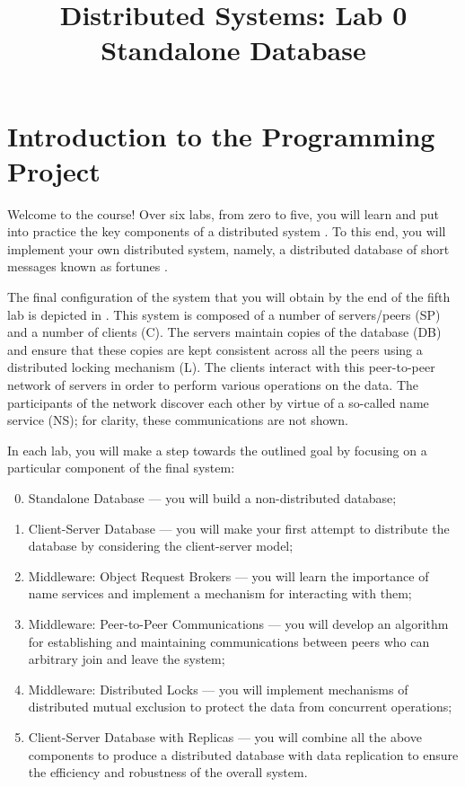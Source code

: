 \documentclass[a4paper,10pt]{article}
\title{%
  Distributed Systems: Lab 0\\%
  Standalone Database%
}
\author{}
\begin{document}
\maketitle

\section{Introduction to the Programming Project} 

Welcome to the course! Over six labs, from zero to five, you will learn and put
into practice the key components of a distributed system \cite{lecture1}. To
this end, you will implement your own distributed system, namely, a distributed
database of short messages known as fortunes \cite{fortune}.

The final configuration of the system that you will obtain by the end of the
fifth lab is depicted in . This system is composed of
a number of servers/peers (SP) and a number of clients (C). The servers maintain
copies of the database (DB) and ensure that these copies are kept consistent
across all the peers using a distributed locking mechanism (L). The clients
interact with this peer-to-peer network of servers in order to perform various
operations on the data. The participants of the network discover each other by
virtue of a so-called name service (NS); for clarity, these communications are
not shown.

In each lab, you will make a step towards the outlined goal by focusing on a
particular component of the final system:
\begin{enumerate}

  \setcounter{enumi}{-1}

  \item Standalone Database --- you will build a non-distributed database;

  \item Client-Server Database --- you will make your first attempt to
  distribute the database by considering the client-server model;

  \item Middleware: Object Request Brokers --- you will learn the importance of
  name services and implement a mechanism for interacting with them;

  \item Middleware: Peer-to-Peer Communications --- you will develop an
  algorithm for establishing and maintaining communications between peers who
  can arbitrary join and leave the system;

  \item Middleware: Distributed Locks --- you will implement mechanisms of
  distributed mutual exclusion to protect the data from concurrent operations;

  \item Client-Server Database with Replicas --- you will combine all the above
  components to produce a distributed database with data replication to ensure
  the efficiency and robustness of the overall system.

\end{enumerate}
\end{document}
